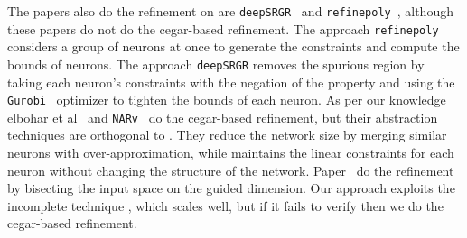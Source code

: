 The papers also do the refinement on \deeppoly{} are \texttt{deepSRGR}~\cite{yang2021improving} and
\texttt{refinepoly}~\cite{singh2019beyond}, 
although these papers do not do the cegar-based refinement. The approach \texttt{refinepoly} considers 
a group of neurons at once to generate the constraints and compute the bounds of neurons. 
The approach \texttt{deepSRGR} removes the 
spurious region by taking each neuron's constraints with the negation of the property and using the 
\texttt{Gurobi}~\cite{gurobioptimizer} optimizer to tighten the bounds of each neuron. 
As per our knowledge elbohar et al~\cite{elboher2020abstraction} and \texttt{NARv}~\cite{liu2022abstraction} 
do the cegar-based refinement, but their abstraction techniques are orthogonal to \deeppoly{}. 
They reduce the network size by merging similar 
neurons with over-approximation, while \deeppoly{} maintains the linear constraints for each neuron without changing the 
structure of the network. Paper~\cite{lin2020art} do the refinement by bisecting the input space on the guided dimension. 
Our approach exploits the incomplete technique \deeppoly{},
which scales well, but if it fails to verify then we do the cegar-based refinement.

